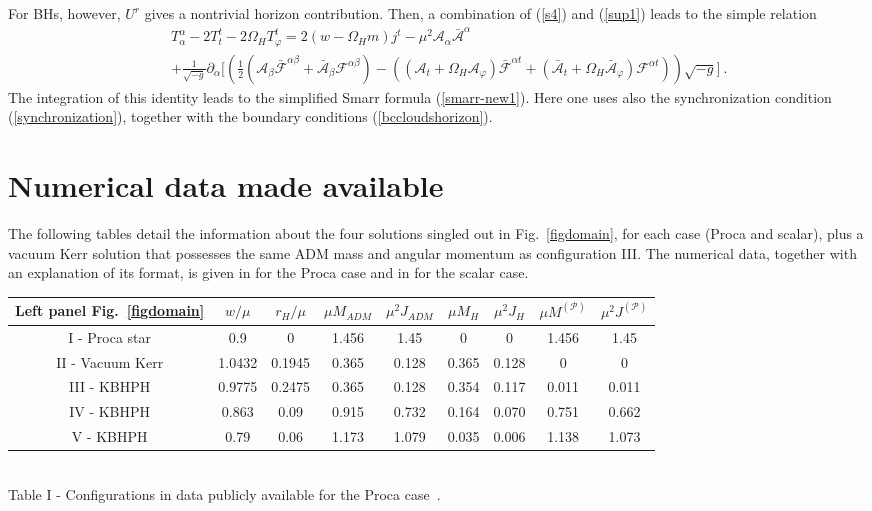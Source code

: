 For BHs, however, $U^r$ gives a nontrivial horizon contribution. Then, a combination of (\ref{s4}) and (\ref{sup1}) leads to the simple relation
\begin{eqnarray}
\label{sup3}
\nonumber
&&T^{\alpha}_\alpha-2T_t^t-2\Omega_H T_\varphi^t =	 2(w-\Omega_H m) j^t - \mu^2 {\mathcal{A}}_\alpha \bar{\mathcal{A}}^\alpha \ \ \ \ \ \ \ \ \ \ \ 
\\
&&+
\frac{1}{\sqrt{-g}}
\partial_\alpha 
\bigg[\left(\frac{1}{2} 
\left(
{\mathcal{A}}_\beta \bar{ {\mathcal{F}}}^{\alpha \beta}+\bar{\mathcal{A}}_\beta { {\mathcal{F}}}^{\alpha \beta}
\right)
-\left(
({\mathcal{A}}_t +\Omega_H {\mathcal{A}}_\varphi)\bar{ {\mathcal{F}}}^{\alpha t}
                +
(\bar{\mathcal{A}}_t +\Omega_H \bar{\mathcal{A}}_\varphi){ {\mathcal{F}}}^{\alpha t}
\right)
\right)  
\sqrt{-g} 
\bigg] \ .
\end{eqnarray}
The integration of this identity leads to the simplified 
Smarr formula (\ref{smarr-new1}). Here one uses also the synchronization 
condition (\ref{synchronization}), 
together with  the boundary conditions (\ref{bccloudshorizon}).  


\section{Numerical data made available}
\label{appendixd}
The following tables detail the information about the four solutions singled out in Fig.~\ref{figdomain}, for each case (Proca and scalar), plus a vacuum Kerr solution that possesses the same ADM mass and angular momentum as configuration III. The numerical data, together with an explanation of its format, is given in  \cite{datakbhph} for the Proca case and in \cite{datakbhsh} for the scalar case.

\bigskip

\begin{center}
\begin{tabular}{|c||c|c|c|c|c|c|c|c|}
\hline
Left panel Fig.~\ref{figdomain} & $w/\mu$  & $r_H/\mu$ & $\mu M_{ADM}$ & $\mu^2J_{ADM}$ & $\mu M_{H}$ & $\mu^2J_{H}$ & $\mu M^{(\mathcal{P})}$ & $\mu^2J^{(\mathcal{P})}$   \\ \hline\hline
I - Proca star  & 0.9 & 0 & 1.456 & 1.45 & 0 & 0 & 1.456 & 1.45 
\\ \hline
II - Vacuum Kerr  & 1.0432 & 0.1945 & 0.365 & 0.128 & 0.365 & 0.128 & 0 & 0
\\ \hline
III - KBHPH & 0.9775 & 0.2475 & 0.365 & 0.128 & 0.354 & 0.117 & 0.011 & 0.011
\\ \hline
IV - KBHPH & 0.863& 0.09 & 0.915 & 0.732 & 0.164 & 0.070 & 0.751 & 0.662
\\ \hline
V - KBHPH & 0.79& 0.06 & 1.173 & 1.079 & 0.035 & 0.006 & 1.138 & 1.073
\\ \hline 
\end{tabular}\\ \bigskip
Table I - Configurations in data publicly available for the Proca case~\cite{datakbhph}.
\end{center}

